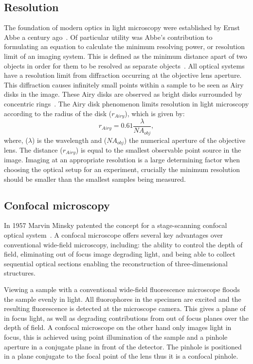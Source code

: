 \subsection{Resolution}
\label{introduction:microscopy:resolution}
The foundation of modern optics in light microscopy were established by Ernst Abbe a century ago~\cite{Pawley2006}. Of particular utility was Abbe's contribution to formulating an equation to calculate the minimum resolving power, or resolution limit of an imaging system. This is defined as the minimum distance apart of two objects in order for them to be resolved as separate objects~\cite{Abbe1873}. All optical systems have a resolution limit from diffraction occurring at the objective lens aperture. This diffraction causes infinitely small points within a sample to be seen as Airy disks in the image. These Airy disks are observed as bright disks surrounded by concentric rings~\cite{Spector2006}. The Airy disk phenomenon limits resolution in light microscopy according to the radius  of the disk ($r_{Airy}$), which is given by:
\begin{equation}
r_{Airy}=0.61\frac{\lambda}{NA_{obj}},
\label{equation:abbe}
\end{equation}
where, ($\lambda$) is the wavelength and ($NA_{obj}$) the numerical aperture of the objective lens. The distance ($r_{Airy}$) is equal to the smallest observable point source in the image. Imaging at an appropriate resolution is a large determining factor when choosing the optical setup for an experiment, crucially the minimum resolution should be smaller than the smallest samples being measured.

\subsection{Confocal microscopy}
\label{introduction:microscopy:confocal}
In 1957 Marvin Minsky patented the concept for a stage-scanning confocal optical system~\cite{Minsky1988}. A confocal microscope offers several key advantages over conventional wide-field microscopy, including: the ability to control the depth of field, eliminating out of focus image degrading light, and being able to collect sequential optical sections enabling the reconstruction of three-dimensional structures.

Viewing a sample with a conventional wide-field fluorescence microscope floods the sample evenly in light. All fluorophores in the specimen are excited and the resulting fluorescence is detected at the microscope camera. This gives a plane of in focus light, as well as degrading contributions from out of focus planes over the depth of field. A confocal microscope on the other hand only images light in focus, this is achieved using point illumination of the sample and a pinhole aperture in a conjugate plane in front of the detector. The pinhole is positioned in a plane conjugate to the focal point of the lens thus it is a confocal pinhole.

